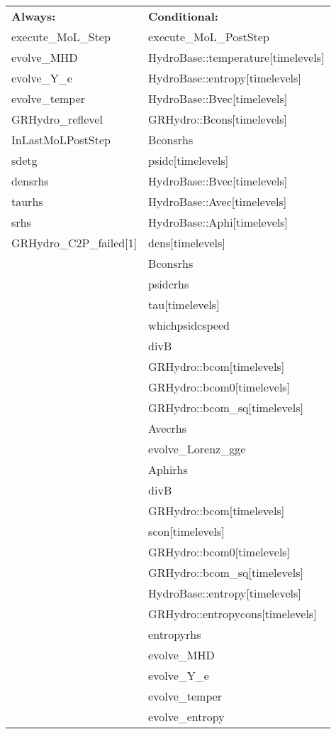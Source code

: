  \begin{tabular*}{160mm}{ll} 

{\bf Always:}& {\bf Conditional:} \\ 
 execute\_MoL\_Step &  execute\_MoL\_PostStep\\ 
 evolve\_MHD &  HydroBase::temperature[timelevels]\\ 
 evolve\_Y\_e &  HydroBase::entropy[timelevels]\\ 
 evolve\_temper &  HydroBase::Bvec[timelevels]\\ 
 GRHydro\_reflevel &  GRHydro::Bcons[timelevels]\\ 
 InLastMoLPostStep &  Bconsrhs\\ 
 sdetg &  psidc[timelevels]\\ 
 densrhs &  HydroBase::Bvec[timelevels]\\ 
 taurhs &  HydroBase::Avec[timelevels]\\ 
 srhs &  HydroBase::Aphi[timelevels]\\ 
 GRHydro\_C2P\_failed[1] &  dens[timelevels]\\ 
~ &  Bconsrhs\\ 
~ &  psidcrhs\\ 
~ &  tau[timelevels]\\ 
~ &  whichpsidcspeed\\ 
~ &  divB\\ 
~ &  GRHydro::bcom[timelevels]\\ 
~ &  GRHydro::bcom0[timelevels]\\ 
~ &  GRHydro::bcom\_sq[timelevels]\\ 
~ &  Avecrhs\\ 
~ &  evolve\_Lorenz\_gge\\ 
~ &  Aphirhs\\ 
~ &  divB\\ 
~ &  GRHydro::bcom[timelevels]\\ 
~ &  scon[timelevels]\\ 
~ &  GRHydro::bcom0[timelevels]\\ 
~ &  GRHydro::bcom\_sq[timelevels]\\ 
~ &  HydroBase::entropy[timelevels]\\ 
~ &  GRHydro::entropycons[timelevels]\\ 
~ &  entropyrhs\\ 
~ &  evolve\_MHD\\ 
~ &  evolve\_Y\_e\\ 
~ &  evolve\_temper\\ 
~ &  evolve\_entropy\\ 

\end{tabular*}
